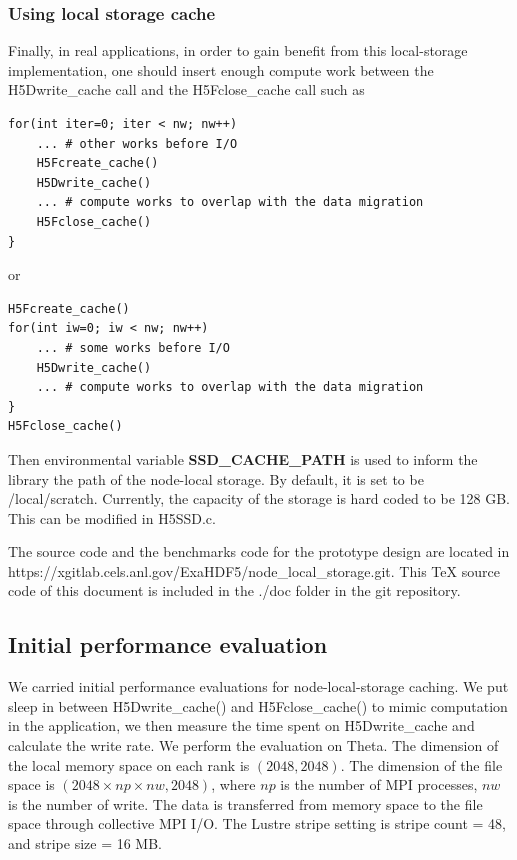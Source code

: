 \documentclass[aps, rmp, 11pt, notitlepage]{revtex4-1}
\begin{document}
\subsubsection{Using local storage cache}
Finally, in real applications, in order to gain benefit from this local-storage implementation,  one should insert enough compute work between the H5Dwrite\_cache call and the H5Fclose\_cache call such as 
\begin{lstlisting}
for(int iter=0; iter < nw; nw++)
	... # other works before I/O
	H5Fcreate_cache()
	H5Dwrite_cache()
	... # compute works to overlap with the data migration
	H5Fclose_cache()
}
\end{lstlisting}
or 
\begin{lstlisting}
H5Fcreate_cache()
for(int iw=0; iw < nw; nw++)
	... # some works before I/O
	H5Dwrite_cache()
	... # compute works to overlap with the data migration
}
H5Fclose_cache()
\end{lstlisting}

Then environmental variable \textbf{SSD\_CACHE\_PATH} is used to inform the library the path of the node-local storage. By default, it is set to be /local/scratch. Currently, the capacity of the storage is hard coded to be 128 GB. This can be modified in H5SSD.c. 

The source code and the benchmarks code for the prototype design are located in \\https://xgitlab.cels.anl.gov/ExaHDF5/node\_local\_storage.git. This TeX source code of this document is included in the ./doc folder in the git repository. 
\subsection{Initial performance evaluation}


We carried initial performance evaluations for node-local-storage caching. We put sleep in between H5Dwrite\_cache() and H5Fclose\_cache() to mimic computation in the application, we then measure the time spent on H5Dwrite\_cache and calculate the write rate. We perform the evaluation on Theta. The dimension of the local memory space on each rank is $(2048, 2048)$. The dimension of the file space is $(2048\times np\times nw, 2048)$, where $np$ is the number of MPI processes, $nw$ is the number of write. The data is transferred from memory space to the file space through collective MPI I/O. The Lustre stripe setting is stripe count = 48, and stripe size = 16 MB. 
\end{document}
